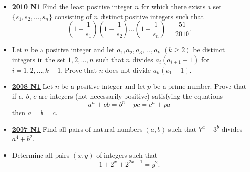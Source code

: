 \documentclass[11pt]{scrartcl}
\begin{document}
\begin{itemize}[leftmargin=*]
    \item \href{https://artofproblemsolving.com/community/c6h418639p2361998}{\textbf{2010 N1}} Find the least positive integer $n$ for which there exists a set $\{s_1, s_2, \dots , s_n\}$ consisting of $n$ distinct positive integers such that
\[ \left( 1 - \frac{1}{s_1} \right) \left( 1 - \frac{1}{s_2} \right) \dots \left( 1 - \frac{1}{s_n} \right) = \frac{51}{2010}.\]
    \item {}  Let $ n$ be a positive integer and let $ a_1,a_2,a_3,\dots,a_k$ $ ( k\geqslant  2)$ be distinct integers in the set $ { 1,2,\dots,n}$ such that $ n$ divides $ a_i(a_{i + 1} - 1)$ for $ i = 1,2,\dots,k - 1$. Prove that $ n$ does not divide $ a_k(a_1 - 1).$
    \item \href{https://artofproblemsolving.com/community/c6h287869p1555927}{\textbf{2008 N1}} Let $n$ be a positive integer and let $p$ be a prime number. Prove that if $a$, $b$, $c$ are integers (not necessarily positive) satisfying the equations\[ a^n + pb = b^n + pc = c^n + pa\]then $a = b = c$.
    \item \href{https://artofproblemsolving.com/community/c6h201181p1106459}{\textbf{2007 N1}} 	Find all pairs of natural numbers $ (a, b)$ such that $ 7^a - 3^b$ divides $ a^4 + b^2$.
    \item {}  Determine all pairs $(x, y)$ of integers such that\[1+2^{x}+2^{2x+1}= y^{2}.\]
\end{itemize}
\newpage
 
\end{document}
